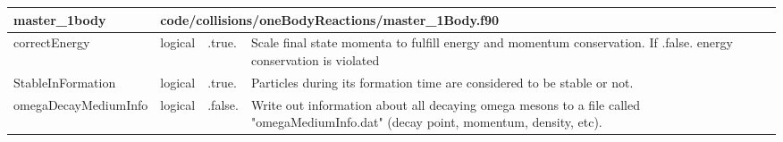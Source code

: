 \documentclass{article}
\begin{document}
\begin{longtable}{llll}
\toprule
\textbf{\large{master\_1body}} & \multicolumn{3}{l}{\footnotesize{code/collisions/oneBodyReactions/master\_1Body.f90}}\\*
\midrule
\endfirsthead
\midrule
\endhead
correctEnergy & \begin{minipage}[t]{2cm}logical\end{minipage} & \begin{minipage}[t]{2cm}.true.\end{minipage} & \begin{minipage}[t]{12cm}Scale final state momenta to fulfill energy and momentum conservation. If .false. energy conservation is violated\end{minipage}\\*
\midrule
StableInFormation & \begin{minipage}[t]{2cm}logical\end{minipage} & \begin{minipage}[t]{2cm}.true.\end{minipage} & \begin{minipage}[t]{12cm}Particles during its formation time are considered to be stable or not.\end{minipage}\\*
\midrule
omegaDecayMediumInfo & \begin{minipage}[t]{2cm}logical\end{minipage} & \begin{minipage}[t]{2cm}.false.\end{minipage} & \begin{minipage}[t]{12cm}Write out information about all decaying omega mesons to a file called "omegaMediumInfo.dat" (decay point, momentum, density, etc).\end{minipage}\\*
\midrule

\end{longtable}
\end{document}
